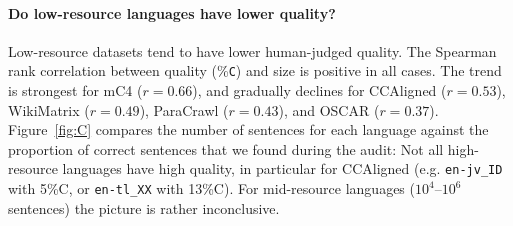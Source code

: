 \paragraph{Do low-resource languages have lower quality?}
Low-resource datasets tend to have lower human-judged quality.
The Spearman rank correlation between quality (\%\texttt{C}) and size is positive in all cases. The trend is strongest for mC4 ($r=0.66$), %
and gradually declines for CCAligned ($r=0.53$), %
WikiMatrix ($r=0.49$), %
ParaCrawl ($r=0.43$), %
and OSCAR ($r=0.37$). %
Figure~\ref{fig:C} compares the number of sentences for each language against the proportion of correct sentences that we found during the audit:
Not all high-resource languages have high quality, in particular for CCAligned (e.g. \texttt{en\nobreakdash-jv\_ID} with 5\%C, or \texttt{en\nobreakdash-tl\_XX} with 13\%C). For mid-resource languages ($10^4$\nobreakdash--$10^6$ sentences) the picture is rather inconclusive.



